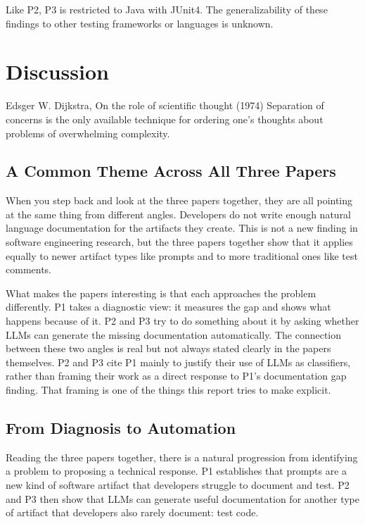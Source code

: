 \documentclass[
    pdftex,
    final,
    11pt,
    a4paper,
    parskip=false,
    oneside,
    footheight=0mm,
    footinclude=false,
    toc=bibliography
]{scrbook}
\begin{document}
Like P2, P3 is restricted to Java with JUnit4. The generalizability of these findings to other testing frameworks or languages is unknown.


\chapter{Discussion}
\label{ch:discussion}

\begin{chapter-quotation}{Edsger W. Dijkstra, On the role of scientific thought (1974)}
Separation of concerns is the only available technique for ordering one's thoughts about problems of overwhelming complexity.
\end{chapter-quotation}

\section{A Common Theme Across All Three Papers}

When you step back and look at the three papers together, they are all pointing at the same thing from different angles. Developers do not write enough natural language documentation for the artifacts they create. This is not a new finding in software engineering research, but the three papers together show that it applies equally to newer artifact types like prompts and to more traditional ones like test comments.

What makes the papers interesting is that each approaches the problem differently. P1 takes a diagnostic view: it measures the gap and shows what happens because of it. P2 and P3 try to do something about it by asking whether LLMs can generate the missing documentation automatically. The connection between these two angles is real but not always stated clearly in the papers themselves. P2 and P3 cite P1 mainly to justify their use of LLMs as classifiers, rather than framing their work as a direct response to P1's documentation gap finding. That framing is one of the things this report tries to make explicit.

\section{From Diagnosis to Automation}

Reading the three papers together, there is a natural progression from identifying a problem to proposing a technical response. P1 establishes that prompts are a new kind of software artifact that developers struggle to document and test. P2 and P3 then show that LLMs can generate useful documentation for another type of artifact that developers also rarely document: test code.
\end{document}
